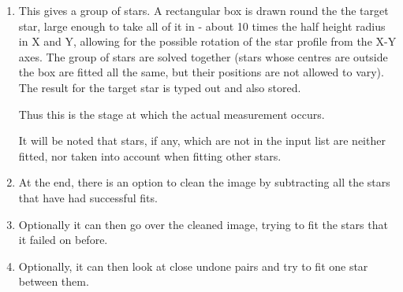 {{\begin{enumerate}
   Go through the input star position table and find for each star its
   importance according to the formula
                                                                               
             Imp = mag(star) - mag(main star) - 6 + d/(star radius)
                                                                               
   Thus the more important the star is the more -ve Imp is. If the
   star is important enough to worry about (Imp less than 0) then the star
   is noted with the more important stars first. Stars inside the
   measuring box (width of about 10 radii) are also included.
   
   If more than fourteen stars
   are important enough to be noted, only the fourteen most important are
   noted.
                                                                               
 \item This gives a group of stars. A rectangular box is drawn round the
   the target star, large enough to take all of it in - about 10 times
   the half height radius in X and Y, allowing for the possible
   rotation of the star profile from the X-Y axes.
   The group of stars are solved together (stars whose centres are
   outside the box are fitted all the same, but their positions are not
   allowed to vary).
   The result for the target star is typed out and also stored.

   Thus this is the stage at which the actual measurement occurs.

   It will be noted that stars, if any,  which are not in the input list 
   are neither fitted, nor taken into account when fitting other stars.
                                                                               
 \item At the end, there is an option to clean the image by subtracting all
   the stars that have had successful fits.
                                                                               
 \item Optionally it can then go over the cleaned image, trying to fit the
    stars that it failed on before.
                                                                               
 \item Optionally, it can then look at close undone pairs and try to fit
    one star between them.
                                                                               

\end{enumerate}}}
